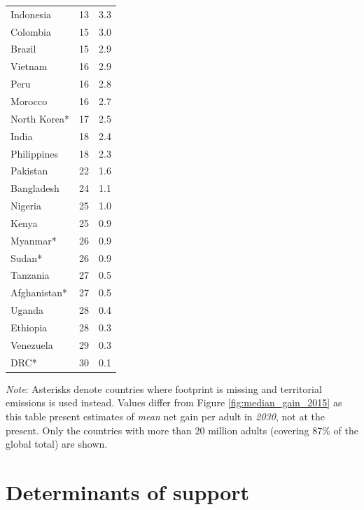 \documentclass[12pt,english]{article}
\begin{document}
\begin{multicols}{2}
{\begin{longtable}[t]{lrr}
Indonesia & 13 & 3.3\\
Colombia & 15 & 3.0\\
Brazil & 15 & 2.9\\
Vietnam & 16 & 2.9\\
Peru & 16 & 2.8\\
Morocco & 16 & 2.7\\
North Korea* & 17 & 2.5\\
India & 18 & 2.4\\
Philippines & 18 & 2.3\\
Pakistan & 22 & 1.6\\
Bangladesh & 24 & 1.1\\
Nigeria & 25 & 1.0\\
Kenya & 25 & 0.9\\
Myanmar* & 26 & 0.9\\
Sudan* & 26 & 0.9\\
Tanzania & 27 & 0.5\\
Afghanistan* & 27 & 0.5\\
Uganda & 28 & 0.4\\
Ethiopia & 28 & 0.3\\
Venezuela & 29 & 0.3\\
DRC* & 30 & 0.1\\
\bottomrule
\end{longtable}     \unskip
    \unpenalty
    \unpenalty}
    \unvbox\ltmcbox
\end{multicols}
    {\footnotesize \textit{Note}: %
    Asterisks denote countries where footprint is missing and territorial emissions is used instead. %
    Values differ from Figure \ref{fig:median_gain_2015} as this table present estimates of \textit{mean} net gain per adult in \textit{2030}, not at the present. Only the countries with more than 20 million adults (covering 87\% of the global total) are shown. 
    }


\clearpage
\section{Determinants of support}\label{app:determinants}
\end{document}
